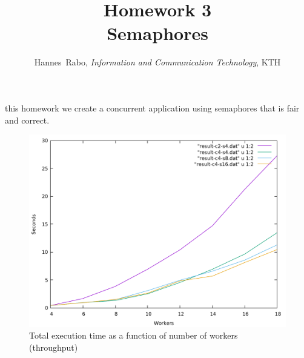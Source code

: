 \documentclass[journal]{IEEEtran}
\begin{document}
\title{Homework 3 \\Semaphores}

\author{Hannes~Rabo, \textit{Information and Communication Technology}, KTH}


%
{}

\maketitle



 this homework we create a concurrent application using semaphores that is fair and correct.

\newpage
\onecolumn

\begin{figure}[h]
\centering
\includegraphics[width=\textwidth]{compare-total-time}
\caption{Total execution time as a function of number of workers (throughput)}
\label{fig:total}
\end{figure}
\end{document}
